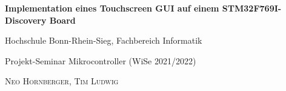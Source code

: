 \documentclass[a4paper,singleside,12pt,titlepage]{scrartcl}
\begin{document}
	    \begin{titlepage}
		
		\hspace*{0pt}
		\vfill
		\begin{center}
			{\Huge\textbf{Implementation eines Touchscreen GUI auf einem STM32F769I-Discovery Board}}\par
			\bigskip
			\bigskip
			{\large Hochschule Bonn-Rhein-Sieg, Fachbereich Informatik}\par
			{\large Projekt-Seminar Mikrocontroller (WiSe 2021/2022)}\par
			\bigskip
			\bigskip
			\bigskip
			\bigskip
			\bigskip
			\textsc{Neo Hornberger, Tim Ludwig}\par
		\end{center}
		\vfill
		\hspace*{0pt}
	\end{titlepage}
	\tableofcontents
	\listoffigures
	\newpage
	
	
	
	\newpage
	\printbibliography[heading=bibnumbered]
\end{document}
